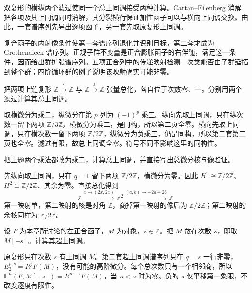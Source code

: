 




\begin{chaptersummary}
	双复形的横纵两个滤过使同一个总上同调接受两种计算。Cartan--Eilenberg 消解把各项及其上同调同时消解，其分裂横行保证加性函子可以与横向上同调交换。由此，一套谱序列先导出逐项函子，另一套先取原复形上同调。

	\ProseParagraphBreak
	复合函子的内射像条件使第一套谱序列退化并识别目标，第二套才成为 Grothendieck 谱序列。正规子群不变量是正合膨胀函子的右伴随，满足这一条件，因而给出群扩张谱序列。五项正合列中的传递映射检测一次类能否由子群延拓到整个群；四阶循环群的例子说明该映射确实可能非零。
\end{chaptersummary}

\BookExercises

\begin{exercise}\label{b4:ex:15-coprime-double}
	把两项上链复形 \(\mathbb Z\xrightarrow{2}\mathbb Z\) 与 \(\mathbb Z\xrightarrow{3}\mathbb Z\) 张量总化，各自位于次数零、一。分别用两个滤过计算其总上同调。
\end{exercise}
\begin{solution}
	取横微分为乘二，纵微分在第 \(p\) 列为 \((-1)^p\) 乘三。纵向先取上同调，只在纵次数一留下两项 \(\mathbb Z/3\mathbb Z\)，横微分为乘二，是同构，所以第二页全零。横向先取上同调，只在横次数一留下两项 \(\mathbb Z/2\mathbb Z\)，纵微分为负乘三，仍是同构，所以第二套第二页也全零。滤过有限，故总上同调全零。符号不同不影响这里的同构性。
\end{solution}

\begin{exercise}\label{b4:ex:15-equal-two-double}
	把上题两个乘法都改为乘二，计算总上同调，并直接写出总微分核与像验证。
\end{exercise}
\begin{solution}
	先纵向取上同调，只在 \(q=1\) 留下两项 \(\mathbb Z/2\mathbb Z\)，横微分为零。因此 \(H^1\cong\mathbb Z/2\mathbb Z\)、\(H^2\cong\mathbb Z/2\mathbb Z\)、其余为零。直接总化得到
	\[
		\mathbb Z\xrightarrow{x\mapsto(2x,2x)}\mathbb Z^2 \xrightarrow{(a,b)\mapsto-2a+2b}\mathbb Z.
	\]
	第一映射单，第二映射的核是对角 \(\mathbb Z\)，商掉第一映射的像后为 \(\mathbb Z/2\mathbb Z\)；第二映射的余核同样为 \(\mathbb Z/2\mathbb Z\)。
\end{solution}

\begin{exercise}\label{b4:ex:15-hyper-shift-object}
	设 \(F\) 为本章所讨论的左正合函子，\(M\) 为对象，\(s\in\mathbb Z\)。把 \(M\) 放在次数 \(s\)，即取 \(M[-s]\)。计算其超上同调。
\end{exercise}
\begin{solution}
	原复形只在次数 \(s\) 有上同调 \(M\)。第二套超上同调谱序列只在 \(q=s\) 一行非零，\(E_2^{p,s}=R^pF(M)\)，没有可能的高阶微分。每个总次数只有一个相邻商，所以 \(\mathbb H^n(F,M[-s])=R^{n-s}F(M)\)，当 \(n<s\) 时为零。负的 \(s\) 仅平移第一象限，不改变逐度有限性。
\end{solution}

